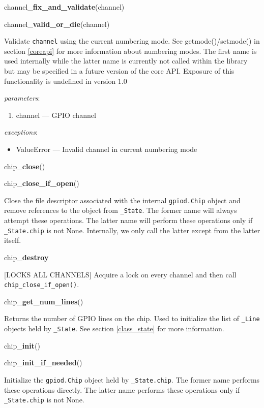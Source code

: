 \documentclass[12pt]{article}
\begin{document}
\medskip

\noindent channel\_\textbf{fix\_and\_validate}(channel)

\noindent channel\_\textbf{valid\_or\_die}(channel)

Validate \texttt{channel} using the current numbering mode. See getmode()/setmode() in section \ref{coreapi} for more information about numbering modes. The first name is used internally while the latter name is currently not called within the library but may be specified in a future version of the core API. Exposure of this functionality is undefined in version 1.0

\textit{parameters}:
\begin{enumerate}      
        \item channel --- GPIO channel
\end{enumerate}
 
 
\textit{exceptions}:
\begin{itemize}
    \item ValueError --- Invalid channel in current numbering mode
\end{itemize}

\noindent chip\_\textbf{close}()

\noindent chip\_\textbf{close\_if\_open}()

Close the file descriptor associated with the internal \texttt{gpiod.Chip} object and remove references to the object from \texttt{\_State}. The former name will always attempt these operations. The latter name will perform these operations only if \texttt{\_State.chip} is not None. Internally, we only call the latter except from the latter itself.

\noindent chip\_\textbf{destroy}

[LOCKS ALL CHANNELS] Acquire a lock on every channel and then call \texttt{chip\_close\_if\_open()}.

\noindent chip\_\textbf{get\_num\_lines}()

Returns the number of GPIO lines on the chip. Used to initialize the list of \texttt{\_Line} objects held by \texttt{\_State}. See section \ref{class_state} for more information.

\noindent chip\_\textbf{init}()

\noindent chip\_\textbf{init\_if\_needed}()

Initialize the \texttt{gpiod.Chip} object held by \texttt{\_State.chip}. The former name performs these operations directly. The latter name performs these operations only if \texttt{\_State.chip} is not None.
\end{document}

